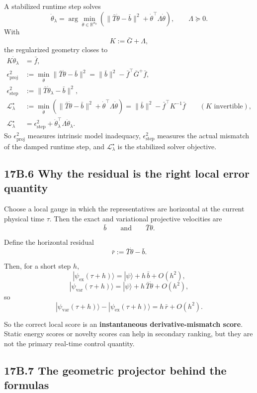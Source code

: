 \documentclass[11pt]{article}
\begin{document}
A stabilized runtime step solves
\[
\dot\theta_\lambda=\arg\min_{\dot\theta\in\mathbb R^{n_\theta}}\left(\|\bar T\dot\theta-\bar b\|^2+\dot\theta^\top\Lambda\dot\theta\right),
\qquad
\Lambda\succeq 0.
\]
With
\[
K:=\bar G+\Lambda,
\]
the regularized geometry closes to
\[
\begin{aligned}
K\dot\theta_\lambda&=\bar f,\\
\epsilon_{\mathrm{proj}}^2&:=\min_{\dot\theta}\|\bar T\dot\theta-\bar b\|^2=\|\bar b\|^2-\bar f^\top\bar G^+\bar f,\\
\epsilon_{\mathrm{step}}^2&:=\|\bar T\dot\theta_\lambda-\bar b\|^2,\\
\mathcal L_\lambda^\star&:=\min_{\dot\theta}\left(\|\bar T\dot\theta-\bar b\|^2+\dot\theta^\top\Lambda\dot\theta\right)=\|\bar b\|^2-\bar f^\top K^{-1}\bar f\qquad (K\text{ invertible}),\\
\mathcal L_\lambda^\star&=\epsilon_{\mathrm{step}}^2+\dot\theta_\lambda^\top\Lambda\dot\theta_\lambda.
\end{aligned}
\]
So $\epsilon_{\mathrm{proj}}^2$ measures intrinsic model inadequacy, $\epsilon_{\mathrm{step}}^2$ measures the actual mismatch of the damped runtime step, and $\mathcal L_\lambda^\star$ is the stabilized solver objective.

\subsection*{17B.6 Why the residual is the right local error quantity}


Choose a local gauge in which the representatives are horizontal at the current physical time $\tau$. Then the exact and variational projective velocities are
\[
\bar b
\qquad\text{and}\qquad
\bar T\dot\theta.
\]

Define the horizontal residual
\[
\bar r:=\bar T\dot\theta-\bar b.
\]

Then, for a short step $h$,
\[
|\psi_{\mathrm{ex}}(\tau+h)\rangle
=
|\psi\rangle+h\,\bar b+O(h^2),
\]
\[
|\psi_{\mathrm{var}}(\tau+h)\rangle
=
|\psi\rangle+h\,\bar T\dot\theta+O(h^2),
\]
so
\[
|\psi_{\mathrm{var}}(\tau+h)\rangle-|\psi_{\mathrm{ex}}(\tau+h)\rangle
=
h\,\bar r+O(h^2).
\]

So the correct local score is an \textbf{instantaneous derivative-mismatch score}. Static energy scores or novelty scores can help in secondary ranking, but they are not the primary real-time control quantity.

\subsection*{17B.7 The geometric projector behind the formulas}
\end{document}
